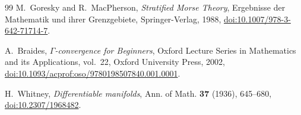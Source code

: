 \documentclass[11pt,reqno]{amsart}
\theoremstyle{definition}
\numberwithin{equation}{section}
\begin{document}
\begin{thebibliography}{99}
M.~Goresky and R.~MacPherson,
\emph{Stratified Morse Theory},
Ergebnisse der Mathematik und ihrer Grenzgebiete, Springer-Verlag, 1988, \href{https://doi.org/10.1007/978-3-642-71714-7}{doi:10.1007/978-3-642-71714-7}.

A.~Braides,
\emph{$\Gamma$-convergence for Beginners},
Oxford Lecture Series in Mathematics and its Applications, vol.~22, Oxford University Press, 2002, \href{https://doi.org/10.1093/acprof:oso/9780198507840.001.0001}{doi:10.1093/acprof:oso/9780198507840.001.0001}.

H.~Whitney,
\emph{Differentiable manifolds},
Ann. of Math. \textbf{37} (1936), 645--680, \href{https://doi.org/10.2307/1968482}{doi:10.2307/1968482}.

\end{thebibliography}
\end{document}
